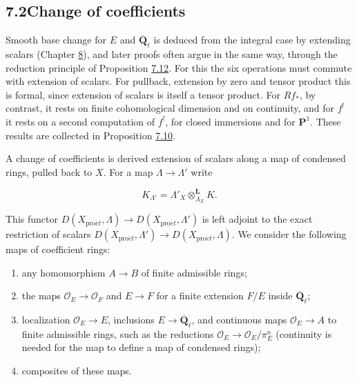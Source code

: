 \documentclass[11pt]{article}
\begin{document}
\subsection*{\texorpdfstring{7.2\quad Change of coefficients}{7.2 Change of coefficients}}
\label{bp608}%
\label{bp609}%
Smooth base change for \(E\) and \(\overline{\mathbf Q}_\ell\) is deduced from the integral case by extending scalars (Chapter \hyperref[bp637]{8}), and later proofs often argue in the same way, through the reduction principle of Proposition \hyperref[bp634]{7.12}. For this the six operations must commute with extension of scalars. For pullback, extension by zero and tensor product this is formal, since extension of scalars is itself a tensor product. For \(Rf_*\), by contrast, it rests on finite cohomological dimension and on continuity, and for \(f^!\) it rests on a second computation of \(f^!\), for closed immersions and for \(\mathbf P^1\). These results are collected in Proposition \hyperref[bp626]{7.10}.

A change of coefficients is derived extension of scalars along a map of condensed rings, pulled back to \(X\). For a map \(\Lambda\to\Lambda'\) write

\[
K_{\Lambda'}=\Lambda'_X\otimes^{\mathbf L}_{\Lambda_X}K.
\]

This functor \(D(X_{\mathrm{pro}\acute{e}t},\Lambda)\to D(X_{\mathrm{pro}\acute{e}t},\Lambda')\) is left adjoint to the exact restriction of scalars \(D(X_{\mathrm{pro}\acute{e}t},\Lambda')\to D(X_{\mathrm{pro}\acute{e}t},\Lambda)\). We consider the following maps of coefficient rings:

\begin{enumerate}
\item any homomorphism \(A\to B\) of finite admissible rings;
\item the maps \(\mathcal O_E\to\mathcal O_F\) and \(E\to F\) for a finite extension \(F/E\) inside \(\overline{\mathbf Q}_\ell\);
\item localization \(\mathcal O_E\to E\), inclusions \(E\to\overline{\mathbf Q}_\ell\), and continuous maps \(\mathcal O_E\to A\) to finite admissible rings, such as the reductions \(\mathcal O_E\to\mathcal O_E/\pi_E^n\) (continuity is needed for the map to define a map of condensed rings);
\item composites of these maps.
\end{enumerate}
\end{document}
